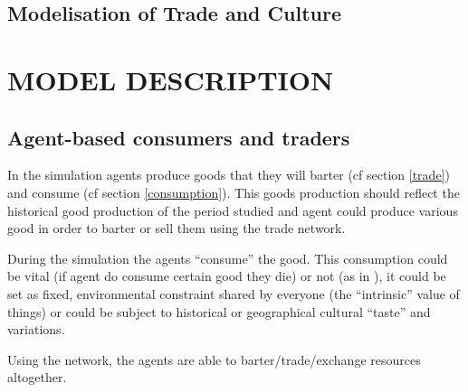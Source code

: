 \documentclass{wscpaperproc}
\begin{document}
\subsection{Modelisation of Trade and Culture}


\section{MODEL DESCRIPTION}

\subsection{Agent-based consumers and traders}

In the simulation agents produce goods that they will barter (cf section \ref{trade}) and consume (cf section \ref{consumption}). This goods production should reflect the historical good production of the period studied and agent could produce various good in order to barter or sell them using the trade network.

During the simulation the agents ``consume'' the good. This consumption could be vital (if agent do consume certain good they die) or not (as in \cite{macmillan_agent-based_2008}), it could be set as fixed, environmental constraint shared by everyone (the ``intrinsic'' value of things) or could be subject to historical or geographical cultural ``taste'' and variations.

Using the network, the agents are able to barter/trade/exchange resources altogether. 
\end{document}
